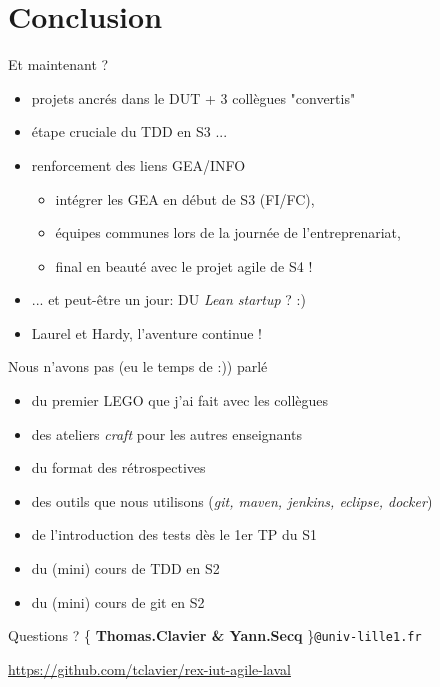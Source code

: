 \documentclass{beamer}
\begin{document}
\section{Conclusion}
\begin{frame}{Et maintenant ?}
  \begin{itemize}
    \item projets ancrés dans le DUT + 3 collègues "convertis"
    \item étape cruciale du TDD en S3 ...
    \item renforcement des liens GEA/INFO
      \begin{itemize}
        \item intégrer les GEA en début de S3 (FI/FC),
        \item équipes communes lors de la journée de l'entreprenariat,
        \item final en beauté avec le projet agile de S4 !
      \end{itemize}
    \item ... et peut-être un jour: DU \emph{Lean startup} ? :)
    \item Laurel et Hardy, l'aventure continue !
  \end{itemize}
\end{frame}

\begin{frame}{Nous n'avons pas (eu le temps de :)) parlé}
  \begin{itemize}
    \item du premier LEGO que j'ai fait avec les collègues
    \item des ateliers \emph{craft} pour les autres enseignants
    \item du format des rétrospectives
    \item des outils que nous utilisons (\textit{git, maven, jenkins, eclipse, docker})
    \item de l'introduction des tests dès le 1er TP du S1
    \item du (mini) cours de TDD en S2
    \item du (mini) cours de git en S2
  \end{itemize}
\end{frame}

\begin{frame}{Questions ?}
  \{ \textbf{Thomas.Clavier \& Yann.Secq} \}\texttt{@univ-lille1.fr}


  \small
  \url{https://github.com/tclavier/rex-iut-agile-laval}
\end{frame}
\end{document}
